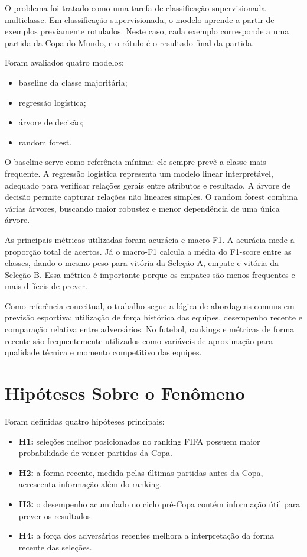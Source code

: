 \documentclass[12pt,a4paper]{article}
\begin{document}
O problema foi tratado como uma tarefa de classificação supervisionada
multiclasse. Em classificação supervisionada, o modelo aprende a partir de
exemplos previamente rotulados. Neste caso, cada exemplo corresponde a uma
partida da Copa do Mundo, e o rótulo é o resultado final da partida.

Foram avaliados quatro modelos:

\begin{itemize}
    \item baseline da classe majoritária;
    \item regressão logística;
    \item árvore de decisão;
    \item random forest.
\end{itemize}

O baseline serve como referência mínima: ele sempre prevê a classe mais
frequente. A regressão logística representa um modelo linear interpretável,
adequado para verificar relações gerais entre atributos e resultado. A árvore de
decisão permite capturar relações não lineares simples. O random forest combina
várias árvores, buscando maior robustez e menor dependência de uma única árvore.

As principais métricas utilizadas foram acurácia e macro-F1. A acurácia mede a
proporção total de acertos. Já o macro-F1 calcula a média do F1-score entre as
classes, dando o mesmo peso para vitória da Seleção A, empate e vitória da
Seleção B. Essa métrica é importante porque os empates são menos frequentes e
mais difíceis de prever.

Como referência conceitual, o trabalho segue a lógica de abordagens comuns em
previsão esportiva: utilização de força histórica das equipes, desempenho
recente e comparação relativa entre adversários. No futebol, rankings e métricas
de forma recente são frequentemente utilizados como variáveis de aproximação
para qualidade técnica e momento competitivo das equipes.

\section{Hipóteses Sobre o Fenômeno}

Foram definidas quatro hipóteses principais:

\begin{itemize}
    \item \textbf{H1:} seleções melhor posicionadas no ranking FIFA possuem maior
    probabilidade de vencer partidas da Copa.
    \item \textbf{H2:} a forma recente, medida pelas últimas partidas antes da
    Copa, acrescenta informação além do ranking.
    \item \textbf{H3:} o desempenho acumulado no ciclo pré-Copa contém informação
    útil para prever os resultados.
    \item \textbf{H4:} a força dos adversários recentes melhora a interpretação
    da forma recente das seleções.
\end{itemize}
\end{document}
